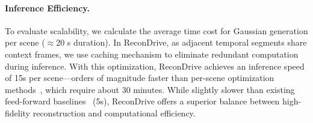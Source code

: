 \paragraph{Inference Efficiency.} To evaluate scalability, we calculate the average time cost for Gaussian generation per scene ($\approx$20 s duration). In ReconDrive, as adjacent temporal segments share context frames, we use caching mechanism to eliminate redundant computation during inference. With this optimization, ReconDrive achieves an inference speed of 15s per scene—orders of magnitude faster than per-scene optimization methods~\cite{yan2024street, chen2023periodic}, which require about 30 minutes. While slightly slower than existing feed-forward baselines~\cite{tian2025drivingforward} (5s), ReconDrive offers a superior balance between high-fidelity reconstruction and computational efficiency.